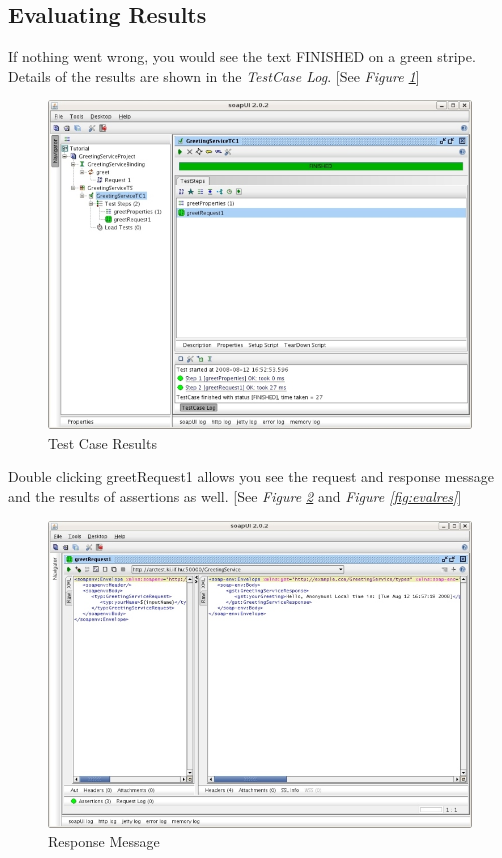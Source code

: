 \documentclass{article}
\begin{document}
\subsection{Evaluating Results}
\label{sec:evalresults}

If nothing went wrong, you would see the text FINISHED on a green
stripe. Details of the results are shown in the \textit{TestCase Log}.
[See \emph{Figure \ref{fig:tcresult}}]

\begin{figure}[!hbp]
\begin{center}
\includegraphics{fig/ARC1PythonDGDraft-img14_resize.jpg}
\caption{Test Case Results}
\label{fig:tcresult}
\end{center}
\end{figure}

Double clicking greetRequest1 allows you see the request and response
message and the results of assertions as well. [See \emph{Figure \ref{fig:respmsg}} 
and \emph{Figure \ref{fig:evalres}}]

\begin{figure}[!hbp]
\begin{center}
\includegraphics{fig/ARC1PythonDGDraft-img15_resize.jpg}
\caption{Response Message}
\label{fig:respmsg}
\end{center}
\end{figure}
\end{document}
